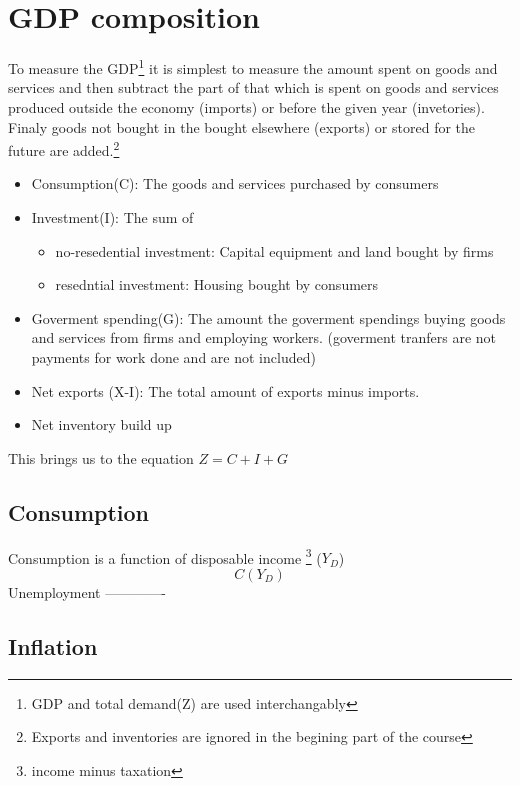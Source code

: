 \documentclass[twocolumn]{article}
\providecommand{\tightlist}{%
  \setlength{\itemsep}{0pt}\setlength{\parskip}{0pt}}
\begin{document}
\hypertarget{gdp-composition}{%
\section{GDP composition}\label{gdp-composition}}

To measure the GDP\footnote{GDP and total demand(Z) are used
  interchangably} it is simplest to measure the amount spent on goods
and services and then subtract the part of that which is spent on goods
and services produced outside the economy (imports) or before the given
year (invetories). Finaly goods not bought in the bought elsewhere
(exports) or stored for the future are added.\footnote{Exports and
  inventories are ignored in the begining part of the course}

\begin{itemize}
\tightlist
\item
  Consumption(C): The goods and services purchased by consumers
\item
  Investment(I): The sum of

  \begin{itemize}
  \tightlist
  \item
    no-resedential investment: Capital equipment and land bought by
    firms
  \item
    resedntial investment: Housing bought by consumers
  \end{itemize}
\item
  Goverment spending(G): The amount the goverment spendings buying goods
  and services from firms and employing workers. (goverment tranfers are
  not payments for work done and are not included)
\item
  Net exports (X-I): The total amount of exports minus imports.
\item
  Net inventory build up
\end{itemize}

This brings us to the equation \(Z = C + I + G\)

\hypertarget{consumption}{%
\subsection{Consumption}\label{consumption}}

Consumption is a function of disposable income \footnote{income minus
  taxation} (\(Y_D\)) \[ C(Y_D) \] Unemployment -------------

\hypertarget{inflation}{%
\subsection{Inflation}\label{inflation}}
\end{document}
